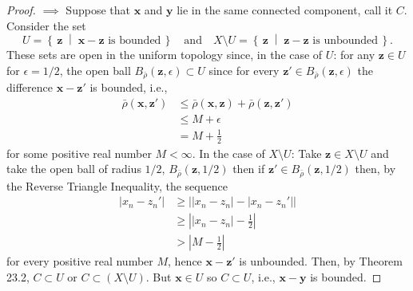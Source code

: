 \begin{proof}
$\implies$ Suppose that $\mathbf{x}$ and $\mathbf{y}$ lie in the
same connected component, call it $C$. Consider the set
\[
U=\left\{\,
\mathbf{z}
\;\middle|\;
\text{$\mathbf{x}-\mathbf{z}$ is bounded}\,\right\}
\quad
\text{and}
\quad
X\setminus
U=\left\{\,\mathbf{z}
\;\middle|\;
\text{$\mathbf{z}-\mathbf{z}$ is unbounded}\,\right\}.
\]
These sets are open in the uniform topology since, in the case
of $U$: for any $\mathbf{z}\in U$ for $\epsilon=1/2$, the open ball
$B_{\bar\rho}(\mathbf{z},\epsilon)\subset U$ since for every
$\mathbf{z}'\in B_{\bar\rho}(\mathbf{z},\epsilon)$ the difference
$\mathbf{x}-\mathbf{z}'$ is bounded, i.e.,
\begin{align*}
\bar\rho(\mathbf{x},\mathbf{z}')
&\leq\bar\rho(\mathbf{x},\mathbf{z})+\bar\rho(\mathbf{z},\mathbf{z}')\\
&\leq M+\epsilon\\
&=M+\frac{1}{2}
\end{align*}
for some positive real number $M<\infty$. In the case of
$X\setminus U$: Take $\mathbf{z}\in X\setminus U$ and take the
open ball of radius $1/2$, $B_{\bar\rho}(\mathbf{z},1/2)$ then if
$\mathbf{z}'\in B_{\bar\rho}(\mathbf{z},1/2)$ then, by the
Reverse Triangle Inequality, the sequence
\begin{align*}
|x_n-z_n'|
&\geq\left||x_n-z_n|-|x_n-z_n'|\right|\\
&\geq\left||x_n-z_n|-\frac{1}{2}\right|\\
&>\left|M-\frac{1}{2}\right|
\end{align*}
for every positive real number $M$, hence
$\mathbf{x}-\mathbf{z}'$ is unbounded. Then, by Theorem 23.2,
$C\subset U$ or $C\subset (X\setminus U)$. But $\mathbf{x}\in U$
so $C\subset U$, i.e., $\mathbf{x}-\mathbf{y}$ is bounded.


\end{proof}
